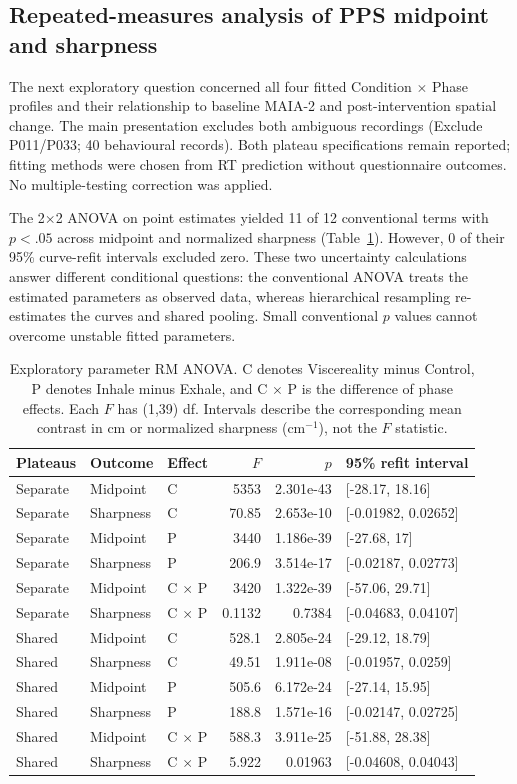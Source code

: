 \subsection{Repeated-measures analysis of PPS midpoint and sharpness}

The next exploratory question concerned all four fitted Condition $\times$ Phase profiles and their relationship to baseline MAIA-2 and post-intervention spatial change. The main presentation excludes both ambiguous recordings (Exclude P011/P033; 40 behavioural records). Both plateau specifications remain reported; fitting methods were chosen from RT prediction without questionnaire outcomes. No multiple-testing correction was applied.

The 2$\times$2 ANOVA on point estimates yielded 11 of 12 conventional terms with $p<.05$ across midpoint and normalized sharpness (Table~\ref{study5:tab:parameter_anova}). However, 0 of their 95\% curve-refit intervals excluded zero. These two uncertainty calculations answer different conditional questions: the conventional ANOVA treats the estimated parameters as observed data, whereas hierarchical resampling re-estimates the curves and shared pooling. Small conventional $p$ values cannot overcome unstable fitted parameters.

\begin{table}[htbp]
\centering\small
\begin{tabular}{lllrrl}
Plateaus & Outcome & Effect & $F$ & $p$ & 95\% refit interval \\
\hline
Separate & Midpoint & C & 5353 & 2.301e-43 & [-28.17, 18.16] \\
Separate & Sharpness & C & 70.85 & 2.653e-10 & [-0.01982, 0.02652] \\
Separate & Midpoint & P & 3440 & 1.186e-39 & [-27.68, 17] \\
Separate & Sharpness & P & 206.9 & 3.514e-17 & [-0.02187, 0.02773] \\
Separate & Midpoint & C $\times$ P & 3420 & 1.322e-39 & [-57.06, 29.71] \\
Separate & Sharpness & C $\times$ P & 0.1132 & 0.7384 & [-0.04683, 0.04107] \\
Shared & Midpoint & C & 528.1 & 2.805e-24 & [-29.12, 18.79] \\
Shared & Sharpness & C & 49.51 & 1.911e-08 & [-0.01957, 0.0259] \\
Shared & Midpoint & P & 505.6 & 6.172e-24 & [-27.14, 15.95] \\
Shared & Sharpness & P & 188.8 & 1.571e-16 & [-0.02147, 0.02725] \\
Shared & Midpoint & C $\times$ P & 588.3 & 3.911e-25 & [-51.88, 28.38] \\
Shared & Sharpness & C $\times$ P & 5.922 & 0.01963 & [-0.04608, 0.04043] \\
\end{tabular}
\caption{Exploratory parameter RM ANOVA. C denotes Viscereality minus Control, P denotes Inhale minus Exhale, and C $\times$ P is the difference of phase effects. Each $F$ has (1,39) df. Intervals describe the corresponding mean contrast in cm or normalized sharpness (cm$^{-1}$), not the $F$ statistic.}
\label{study5:tab:parameter_anova}
\end{table}

